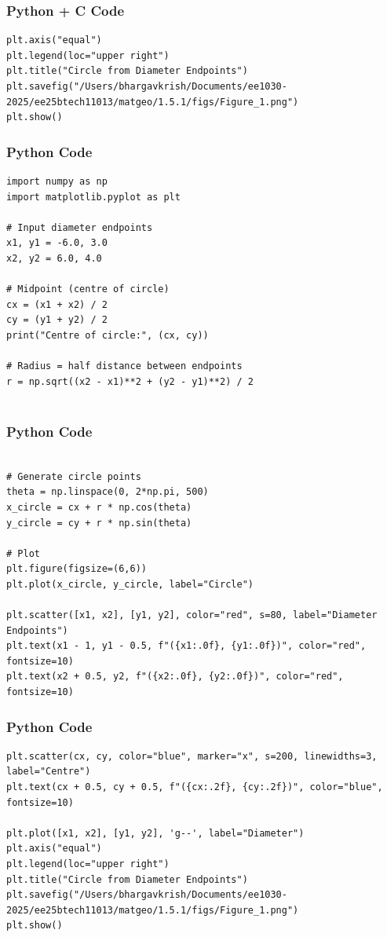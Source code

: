 \documentclass{beamer}
\begin{document}
\begin{frame}[fragile]
    \frametitle{Python + C Code}
    \begin{lstlisting}
plt.axis("equal")
plt.legend(loc="upper right")
plt.title("Circle from Diameter Endpoints")
plt.savefig("/Users/bhargavkrish/Documents/ee1030-2025/ee25btech11013/matgeo/1.5.1/figs/Figure_1.png")
plt.show()
    \end{lstlisting}
\end{frame}

\begin{frame}[fragile]
    \frametitle{Python Code}
    \begin{lstlisting}
import numpy as np
import matplotlib.pyplot as plt

# Input diameter endpoints
x1, y1 = -6.0, 3.0
x2, y2 = 6.0, 4.0

# Midpoint (centre of circle)
cx = (x1 + x2) / 2
cy = (y1 + y2) / 2
print("Centre of circle:", (cx, cy))

# Radius = half distance between endpoints
r = np.sqrt((x2 - x1)**2 + (y2 - y1)**2) / 2


    \end{lstlisting}
\end{frame}

\begin{frame}[fragile]
    \frametitle{Python Code}
    \begin{lstlisting}

# Generate circle points
theta = np.linspace(0, 2*np.pi, 500)
x_circle = cx + r * np.cos(theta)
y_circle = cy + r * np.sin(theta)

# Plot
plt.figure(figsize=(6,6))
plt.plot(x_circle, y_circle, label="Circle")

plt.scatter([x1, x2], [y1, y2], color="red", s=80, label="Diameter Endpoints")
plt.text(x1 - 1, y1 - 0.5, f"({x1:.0f}, {y1:.0f})", color="red", fontsize=10)
plt.text(x2 + 0.5, y2, f"({x2:.0f}, {y2:.0f})", color="red", fontsize=10)

    \end{lstlisting}
\end{frame}

\begin{frame}[fragile]
    \frametitle{Python Code}
    \begin{lstlisting}
plt.scatter(cx, cy, color="blue", marker="x", s=200, linewidths=3, label="Centre")
plt.text(cx + 0.5, cy + 0.5, f"({cx:.2f}, {cy:.2f})", color="blue", fontsize=10)

plt.plot([x1, x2], [y1, y2], 'g--', label="Diameter")
plt.axis("equal")
plt.legend(loc="upper right")
plt.title("Circle from Diameter Endpoints")
plt.savefig("/Users/bhargavkrish/Documents/ee1030-2025/ee25btech11013/matgeo/1.5.1/figs/Figure_1.png")
plt.show()
    \end{lstlisting}
\end{frame}
\end{document}
